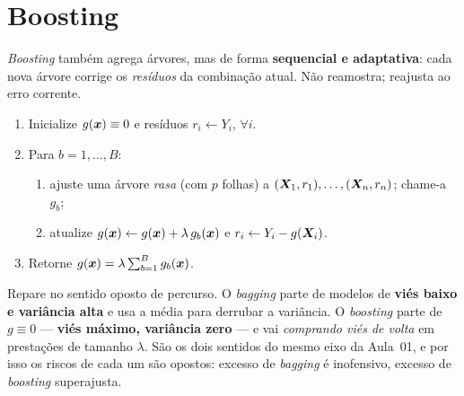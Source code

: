 \documentclass[11pt,a4paper]{article}
\begin{document}
\section{Boosting}
\emph{Boosting} também agrega árvores, mas de forma \textbf{sequencial e
adaptativa}: cada nova árvore corrige os \emph{resíduos} da combinação atual. Não
reamostra; reajusta ao erro corrente.

\begin{tcolorbox}[colback=cinzaclaro,colframe=azulufrj,title={Algoritmo (boosting de árvores para regressão)}]
\begin{enumerate}[leftmargin=1.4cm,nosep]
  \item Inicialize $g(\bm{x})\equiv 0$ e resíduos $r_i \leftarrow Y_i$, $\forall i$.
  \item Para $b=1,\dots,B$:
    \begin{enumerate}[label=(\alph*),nosep]
      \item ajuste uma árvore \emph{rasa} (com $p$ folhas) a
            $(\bm{X}_1,r_1),\dots,(\bm{X}_n,r_n)$; chame-a $g_b$;
      \item atualize $g(\bm{x})\leftarrow g(\bm{x})+\lambda\,g_b(\bm{x})$ e
            $r_i\leftarrow Y_i-g(\bm{X}_i)$.
    \end{enumerate}
  \item Retorne $g(\bm{x})=\lambda\sum_{b=1}^B g_b(\bm{x})$.
\end{enumerate}
\end{tcolorbox}

\begin{ideia}
Repare no sentido oposto de percurso. O \emph{bagging} parte de modelos de
\textbf{viés baixo e variância alta} e usa a média para derrubar a variância. O
\emph{boosting} parte de $g\equiv 0$ --- \textbf{viés máximo, variância zero} --- e
vai \emph{comprando viés de volta} em prestações de tamanho $\lambda$. São os dois
sentidos do mesmo eixo da Aula~01, e por isso os riscos de cada um são opostos:
excesso de \emph{bagging} é inofensivo, excesso de \emph{boosting} superajusta.
\end{ideia}
\end{document}
